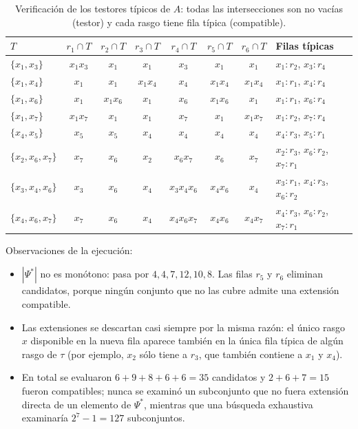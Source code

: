 \documentclass[11pt, a4paper]{article}
\theoremstyle{definition}
\theoremstyle{plain}
\newcommand{\Psis}{\Psi^{*}}
\newcommand{\x}[1]{x_{#1}}
\newcommand{\cj}[1]{\{#1\}}
\begin{document}
\begin{table}[h]
\centering
\small
\begin{tabular}{l cccccc l}
\toprule
$T$ & $r_1\cap T$ & $r_2\cap T$ & $r_3\cap T$ & $r_4\cap T$ & $r_5\cap T$ & $r_6\cap T$ & Filas típicas \\
\midrule
$\cj{\x1,\x3}$ & $\x1\x3$ & $\x1$ & $\x1$ & $\x3$ & $\x1$ & $\x1$ & $\x1{:}r_2$, $\x3{:}r_4$ \\
$\cj{\x1,\x4}$ & $\x1$ & $\x1$ & $\x1\x4$ & $\x4$ & $\x1\x4$ & $\x1\x4$ & $\x1{:}r_1$, $\x4{:}r_4$ \\
$\cj{\x1,\x6}$ & $\x1$ & $\x1\x6$ & $\x1$ & $\x6$ & $\x1\x6$ & $\x1$ & $\x1{:}r_1$, $\x6{:}r_4$ \\
$\cj{\x1,\x7}$ & $\x1\x7$ & $\x1$ & $\x1$ & $\x7$ & $\x1$ & $\x1\x7$ & $\x1{:}r_2$, $\x7{:}r_4$ \\
$\cj{\x4,\x5}$ & $\x5$ & $\x5$ & $\x4$ & $\x4$ & $\x4$ & $\x4$ & $\x4{:}r_3$, $\x5{:}r_1$ \\
$\cj{\x2,\x6,\x7}$ & $\x7$ & $\x6$ & $\x2$ & $\x6\x7$ & $\x6$ & $\x7$ & $\x2{:}r_3$, $\x6{:}r_2$, $\x7{:}r_1$ \\
$\cj{\x3,\x4,\x6}$ & $\x3$ & $\x6$ & $\x4$ & $\x3\x4\x6$ & $\x4\x6$ & $\x4$ & $\x3{:}r_1$, $\x4{:}r_3$, $\x6{:}r_2$ \\
$\cj{\x4,\x6,\x7}$ & $\x7$ & $\x6$ & $\x4$ & $\x4\x6\x7$ & $\x4\x6$ & $\x4\x7$ & $\x4{:}r_3$, $\x6{:}r_2$, $\x7{:}r_1$ \\
\bottomrule
\end{tabular}
\caption{Verificación de los testores típicos de $A$: todas las intersecciones son no vacías (testor) y cada rasgo tiene fila típica (compatible).}
\label{tab:verif}
\end{table}

Observaciones de la ejecución:
\begin{itemize}[nosep]
\item $|\Psis|$ no es monótono: pasa por $4,4,7,12,10,8$. Las filas $r_5$ y $r_6$
  eliminan candidatos, porque ningún conjunto que no las cubre admite una
  extensión compatible.
\item Las extensiones se descartan casi siempre por la misma razón: el único
  rasgo $x$ disponible en la nueva fila aparece también en la única fila
  típica de algún rasgo de $\tau$ (por ejemplo, $\x2$ sólo tiene a $r_3$, que
  también contiene a $\x1$ y $\x4$).
\item En total se evaluaron $6+9+8+6+6=35$ candidatos y $2+6+7=15$ fueron compatibles; nunca se
  examinó un subconjunto que no fuera extensión directa de un elemento de
  $\Psis$, mientras que una búsqueda exhaustiva examinaría $2^7-1=127$ subconjuntos.
\end{itemize}
\end{document}
